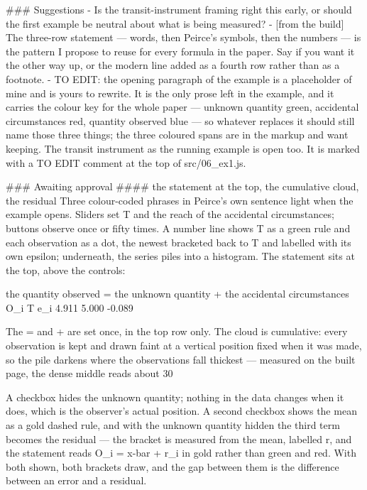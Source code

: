 ### Suggestions
- Is the transit-instrument framing right this early, or should the first
  example be neutral about what is being measured?
- [from the build] The three-row statement — words, then Peirce's symbols, then
  the numbers — is the pattern I propose to reuse for every formula in the
  paper. Say if you want it the other way up, or the modern line added as a
  fourth row rather than as a footnote.
- TO EDIT: the opening paragraph of the example is a placeholder of mine and is
  yours to rewrite. It is the only prose left in the example, and it carries the
  colour key for the whole paper — unknown quantity green, accidental
  circumstances red, quantity observed blue — so whatever replaces it should
  still name those three things; the three coloured spans are in the markup and
  want keeping. The transit instrument as the running example is open too. It is
  marked with a TO EDIT comment at the top of src/06_ex1.js.

### Awaiting approval
#### the statement at the top, the cumulative cloud, the residual
Three colour-coded phrases in Peirce's own sentence light when the example
opens. Sliders set T and the reach of the accidental circumstances; buttons
observe once or fifty times. A number line shows T as a green rule and each
observation as a dot, the newest bracketed back to T and labelled with its own
epsilon; underneath, the series piles into a histogram. The statement sits at
the top, above the controls:

    the quantity observed = the unknown quantity + the accidental circumstances
             O_i                     T                        e_i
            4.911                  5.000                    -0.089

The = and + are set once, in the top row only. The cloud is cumulative: every
observation is kept and drawn faint at a vertical position fixed when it was
made, so the pile darkens where the observations fall thickest — measured on the
built page, the dense middle reads about 30%

A checkbox hides the unknown quantity; nothing in the data changes when it does,
which is the observer's actual position. A second checkbox shows the mean as a
gold dashed rule, and with the unknown quantity hidden the third term becomes
the residual — the bracket is measured from the mean, labelled r, and the
statement reads O_i = x-bar + r_i in gold rather than green and red. With both
shown, both brackets draw, and the gap between them is the difference between an
error and a residual.

